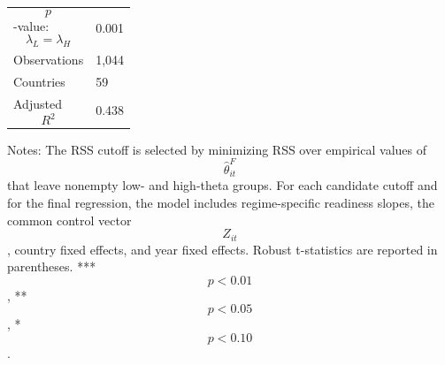 \begin{table}[H]
\begin{threeparttable}
\begin{tabularx}{\textwidth}{lY}
$$p$$-value: $$\lambda_L=\lambda_H$$ & 0.001 \\
Observations & 1,044 \\
Countries & 59 \\
Adjusted $$R^2$$ & 0.438 \\
\bottomrule
\end{tabularx}
\begin{tablenotes}[flushleft]\footnotesize
\item Notes: The RSS cutoff is selected by minimizing RSS over empirical values of $$\widehat{\theta}^{F}_{it}$$ that leave nonempty low- and high-theta groups. For each candidate cutoff and for the final regression, the model includes regime-specific readiness slopes, the common control vector $$Z_{it}$$, country fixed effects, and year fixed effects. Robust t-statistics are reported in parentheses. *** $$p<0.01$$, ** $$p<0.05$$, * $$p<0.10$$.
\end{tablenotes}
\end{threeparttable}
\end{table}
